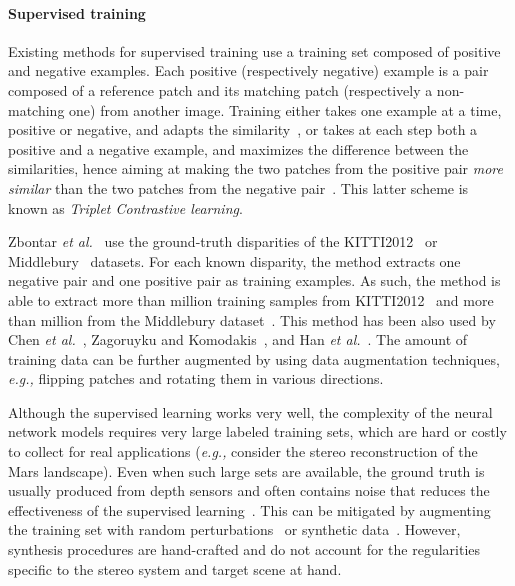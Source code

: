 \documentclass[10pt,journal,compsoc]{IEEEtran}
\newcommand{\eg}{\emph{e.g., }}
\newcommand{\etal}{\emph{et al.}}
\begin{document}
\paragraph{Supervised training} 
\label{sec:supervisied_matching}
Existing methods for supervised training use a training set composed of positive and negative examples. Each positive  (respectively negative) example is a pair composed of a reference patch and its matching patch (respectively a non-matching one) from another image.  Training either takes one example at a time, positive or negative, and adapts the similarity~\cite{chen2015deep,simo2015discriminative,han2015matchnet,zagoruyko2015learning},  or takes at each step both a positive and a negative example, and maximizes the difference between the similarities, hence aiming at making the two patches from the positive pair \textit{more similar} than the two patches from the negative pair~\cite{balntas2016pn,kumar2016learning,zbontar2015computing}. This latter scheme is known as \textit{Triplet Contrastive learning}.

Zbontar \etal~\cite{zbontar2015computing,zbontar2016stereo} use the ground-truth disparities of the KITTI2012~\cite{geiger2012we} or Middlebury~\cite{scharstein2014high}  datasets. For each known disparity, the method extracts one negative pair and one positive pair as training examples. As such, the method is able to extract more than  million training samples from KITTI2012~\cite{geiger2012we} and more than  million from the Middlebury dataset~\cite{scharstein2014high}. This method has been also used by Chen \etal~\cite{chen2015deep},   Zagoruyku and  Komodakis~\cite{zagoruyko2015learning}, and Han \etal~\cite{han2015matchnet}. The amount of training data can be further augmented by using data augmentation techniques, \eg flipping patches and rotating them in various directions.

Although  the supervised learning works very well, the complexity of the neural network models requires very large labeled training sets, which are hard or costly to collect for real applications (\eg consider the stereo reconstruction of the Mars landscape). Even when such large sets are available, the ground truth is usually produced from depth sensors  and often contains noise that reduces the effectiveness of the supervised learning~\cite{sukhbaatar2014learning}. This can be mitigated by augmenting the training set with random perturbations~\cite{zbontar2015computing} or synthetic data~\cite{fischer2014descriptor,mayer2016large}. However, synthesis procedures are hand-crafted and do not account for the regularities specific to the stereo system and target scene at hand.
\end{document}
